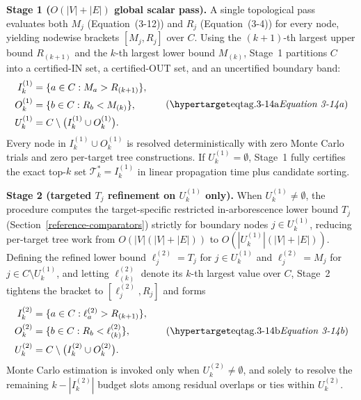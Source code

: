 \textbf{Stage 1 ($O(|V|+|E|)$ global scalar pass).}
A single topological pass evaluates both $M_j$ (Equation~(3-12)) and $R_j$
(Equation~(3-4)) for every node, yielding nodewise brackets $[M_j,R_j]$ over
$C$. Using the $(k+1)$-th largest upper bound $R_{(k+1)}$ and the $k$-th
largest lower bound $M_{(k)}$, Stage~1 partitions $C$ into a certified-IN
set, a certified-OUT set, and an uncertified boundary band:
\[
\begin{aligned}
I_k^{(1)}&=\{a\in C : M_a > R_{(k+1)}\},\\
O_k^{(1)}&=\{b\in C : R_b < M_{(k)}\},\\
U_k^{(1)}&=C\setminus\bigl(I_k^{(1)}\cup O_k^{(1)}\bigr).
\end{aligned}
\eqtag[Stage 1 scalar certified screening partition]{3-14a}
\]
Every node in $I_k^{(1)}\cup O_k^{(1)}$ is resolved deterministically with
zero Monte Carlo trials and zero per-target tree constructions. If
$U_k^{(1)}=\emptyset$, Stage~1 fully certifies the exact top-$k$ set
$\mathcal{T}_k^*=I_k^{(1)}$ in linear propagation time plus candidate
sorting.

\textbf{Stage 2 (targeted $T_j$ refinement on $U_k^{(1)}$ only).}
When $U_k^{(1)}\ne\emptyset$, the procedure computes the target-specific
restricted in-arborescence lower bound $T_j$
(Section~\ref{reference-comparators}) strictly for boundary nodes
$j\in U_k^{(1)}$, reducing per-target tree work from
$O(|V|(|V|+|E|))$ to $O(|U_k^{(1)}|(|V|+|E|))$. Defining the refined lower
bound $\ell_j^{(2)}=T_j$ for $j\in U_k^{(1)}$ and $\ell_j^{(2)}=M_j$ for
$j\in C\setminus U_k^{(1)}$, and letting $\ell_{(k)}^{(2)}$ denote its
$k$-th largest value over $C$, Stage~2 tightens the bracket to
$[\ell_j^{(2)},R_j]$ and forms
\[
\begin{aligned}
I_k^{(2)}&=\{a\in C : \ell_a^{(2)} > R_{(k+1)}\},\\
O_k^{(2)}&=\{b\in C : R_b < \ell_{(k)}^{(2)}\},\\
U_k^{(2)}&=C\setminus\bigl(I_k^{(2)}\cup O_k^{(2)}\bigr).
\end{aligned}
\eqtag[Stage 2 tree-refined certified screening partition]{3-14b}
\]
Monte Carlo estimation is invoked only when $U_k^{(2)}\ne\emptyset$, and
solely to resolve the remaining $k-|I_k^{(2)}|$ budget slots among residual
overlaps or ties within $U_k^{(2)}$.


